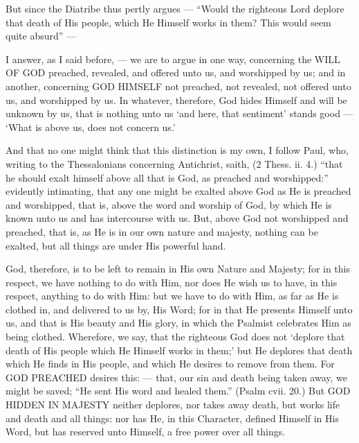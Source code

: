 But since the Diatribe thus pertly argues — “Would the righteous Lord deplore that death of His people, which He Himself works in them? This would seem quite absurd” —

I answer, as I said before, — we are to argue in one way, concerning the \textsc{WILL OF GOD} preached, revealed, and offered unto us, and worshipped by us; and in another, concerning \textsc{GOD HIMSELF} not preached, not revealed, not offered unto us, and worshipped by us. In whatever, therefore, God hides Himself and will be unknown by us, that is nothing unto us ‘and here, that sentiment’ stands good — ‘What is above us, does not concern us.’

And that no one might think that this distinction is my own, I follow Paul, who, writing to the Thessalonians concerning Antichrist, saith, (2 Thess. ii. 4.) “that he should exalt himself above all that is God, as preached and worshipped:” evidently intimating, that any one might be exalted above God as He is preached and worshipped, that is, above the word and worship of God, by which He is known unto us and has intercourse with us. But, above God not worshipped and preached, that is, as He is in our own nature and majesty, nothing can be exalted, but all things are under His powerful hand.

God, therefore, is to be left to remain in His own Nature and Majesty; for in this respect, we have nothing to do with Him, nor does He wish us to have, in this respect, anything to do with Him: but we have to do with Him, as far as He is clothed in, and delivered to us by, His Word; for in that He presents Himself unto us, and that is His beauty and His glory, in which the Psalmist celebrates Him as being clothed. Wherefore, we say, that the righteous God does not ‘deplore that death of His people which He Himself works in them;’ but He deplores that death which He finds in His people, and which He desires to remove from them. For \textsc{GOD PREACHED} desires this: — that, our sin and death being taken away, we might be saved; “He sent His word and healed them.” (Psalm cvii. 20.) But \textsc{GOD HIDDEN IN MAJESTY} neither deplores, nor takes away death, but works life and death and all things: nor has He, in this Character, defined Himself in His Word, but has reserved unto Himself, a free power over all things.

